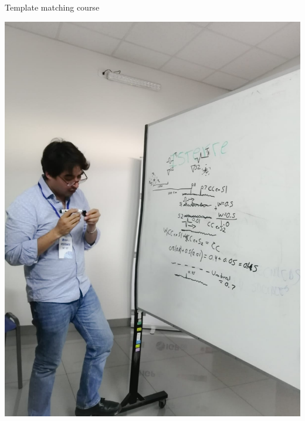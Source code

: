 \documentclass{beamer}
\begin{document}
\begin{frame}

 {Template matching course}
 
 \begin{minipage}{0.45\linewidth}
  \includegraphics[width=1\linewidth]{images/Lima1}
 \end{minipage}
 \begin{minipage}{0.4\linewidth}

\end{minipage}
\end{frame}
\end{document}
